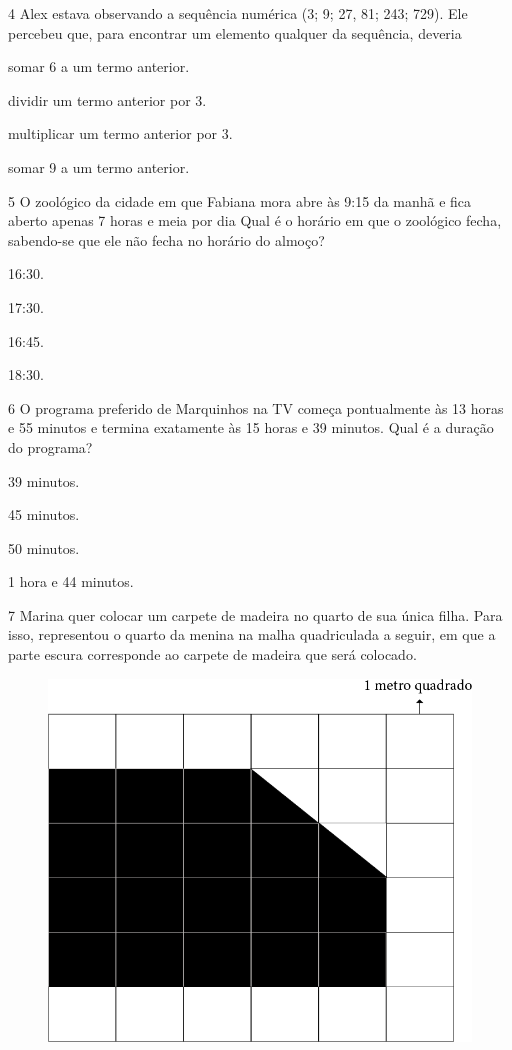 \num{4} Alex estava observando a sequência numérica (3; 9; 27, 81; 243; 729).
Ele percebeu que, para encontrar um elemento qualquer da sequência,
deveria

\begin{escolha}
\item
  somar 6 a um termo anterior.
\item
  dividir um termo anterior por 3.
\item
  multiplicar um termo anterior por 3.
\item
  somar 9 a um termo anterior.
\end{escolha}


\num{5} O zoológico da cidade em que Fabiana mora abre às 9:15 da manhã e fica
aberto apenas 7 horas e meia por dia Qual é o horário em que o zoológico
fecha, sabendo-se que ele não fecha no horário do almoço?

\begin{multicols}{2}
\begin{escolha}
\item
  16:30.
\item
  17:30.
\item
  16:45.
\item
  18:30.
\end{escolha}
\end{multicols}

\num{6} O programa preferido de Marquinhos na TV começa pontualmente às 13
horas e 55 minutos e termina exatamente às 15 horas e 39 minutos. Qual é a
duração do programa?

\begin{escolha}
\item
  39 minutos.
\item
  45 minutos.
\item
  50 minutos.
\item
  1 hora e 44 minutos.
\end{escolha}

\pagebreak
\num{7} Marina quer colocar um carpete de madeira no quarto de sua única filha.
Para isso, representou o quarto da menina na malha quadriculada a seguir, em que a parte escura corresponde ao carpete de madeira que será
colocado.

\begin{figure}[htpb!]
\centering
\includegraphics[width=.5\textwidth]{media/image84.png}
\end{figure}

